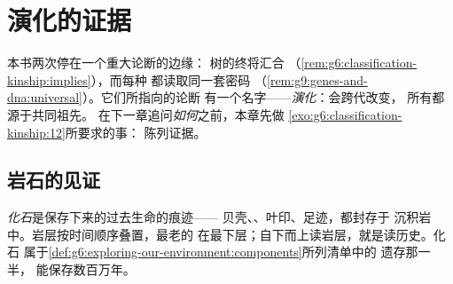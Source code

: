 \chapter{演化的证据}\label{ch:g9:evidence-of-evolution}

本书两次停在一个重大论断的边缘：
树的终将汇合
（\cref{rem:g6:classification-kinship:implies}），而每种
都读取同一套密码
（\cref{rem:g9:genes-and-dna:universal}）。它们所指向的论断
有一个名字——\emph{演化}：会跨代改变，
所有都源于共同祖先。
在下一章追问\emph{如何}之前，本章先做
\cref{exo:g6:classification-kinship:12}所要求的事：
陈列证据。

\section{岩石的见证}

\begin{definition}[化石]\label{def:g9:evidence-of-evolution:fossils}
\emph{化石}是保存下来的过去生命的痕迹——
贝壳、、叶印、足迹，都封存于
沉积岩中。岩层按时间顺序叠置，最老的
在最下层；自下而上读岩层，就是读历史。化石
属于\cref{def:g6:exploring-our-environment:components}所列清单中的
遗存那一半，
能保存数百万年。
\end{definition}

